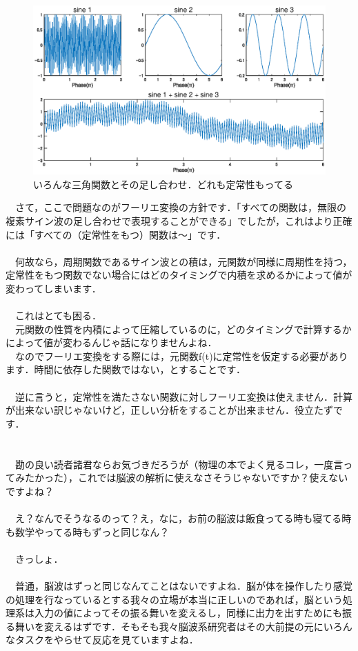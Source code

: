 \documentclass[11pt,a4paper]{ujreport} 	%
\begin{document}
\begin{figure}[H]
  \label{im:stat1}
  \centering
  \includegraphics[width=15cm]{../figures/stationarity1.eps}
  \caption{いろんな三角関数とその足し合わせ．どれも定常性もってる}
\end{figure}
　さて，ここで問題なのがフーリエ変換の方針です．「すべての関数は，無限の複素サイン波の足し合わせで表現することができる」でしたが，これはより正確には「すべての（定常性をもつ）関数は〜」です．\\ \\
　何故なら，周期関数であるサイン波との積は，元関数が同様に周期性を持つ，定常性をもつ関数でない場合にはどのタイミングで内積を求めるかによって値が変わってしまいます．\\
\\ 
　これはとても困る．\\
　元関数の性質を内積によって圧縮しているのに，どのタイミングで計算するかによって値が変わるんじゃ話になりませんよね．\\
　なのでフーリエ変換をする際には，元関数f(t)に定常性を仮定する必要があります．時間に依存した関数ではない，とすることです．\\
\\
　逆に言うと，定常性を満たさない関数に対しフーリエ変換は使えません．計算が出来ない訳じゃないけど，正しい分析をすることが出来ません．役立たずです．\\
\\
\\
　勘の良い読者諸君ならお気づきだろうが（物理の本でよく見るコレ，一度言ってみたかった），これでは脳波の解析に使えなさそうじゃないですか？使えないですよね？\\
\\
　え？なんでそうなるのって？え，なに，お前の脳波は飯食ってる時も寝てる時も数学やってる時もずっと同じなん？\\ \\
　きっしょ．\\
\\
　普通，脳波はずっと同じなんてことはないですよね．脳が体を操作したり感覚の処理を行なっているとする我々の立場が本当に正しいのであれば，脳という処理系は入力の値によってその振る舞いを変えるし，同様に出力を出すためにも振る舞いを変えるはずです．そもそも我々脳波系研究者はその大前提の元にいろんなタスクをやらせて反応を見ていますよね．
\end{document}
